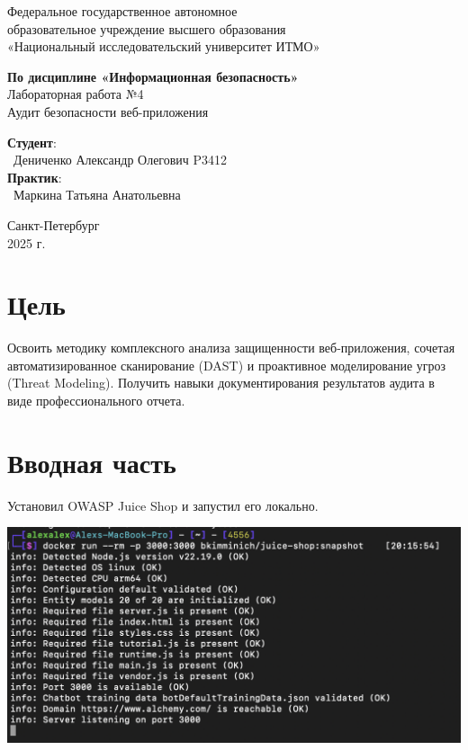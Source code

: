 \documentclass{article}
\begin{document}
\begin{center}
    \Large
    Федеральное государственное автономное \\
    образовательное учреждение высшего образования \\ 
    «Национальный исследовательский университет ИТМО»\\
    \vspace{0.5cm}
    \large
    
    \vspace{1cm}
    \Large
    \textbf{По дисциплине «Информационная безопасность»} \\
        Лабораторная работа №4\\
        Аудит безопасности веб-приложения
    \large
    \vspace{8cm}

    \begin{minipage}{.33\textwidth}
    \end{minipage}
    \hfill
    \begin{minipage}{.4\textwidth}
    
        \textbf{Студент}: \vspace{.1cm} \\
        \ Дениченко Александр Олегович P3412\\
        \textbf{Практик}:  \\
        \ Маркина Татьяна Анатольевна
    \end{minipage}
    \vfill
Санкт-Петербург\\ 2025 г.
\end{center}
\pagestyle{empty}
\newpage
\pagestyle{plain}

\section*{Цель}
Освоить методику комплексного анализа защищенности веб-приложения, сочетая
автоматизированное сканирование (DAST) и проактивное моделирование угроз (Threat Modeling).
Получить навыки документирования результатов аудита в виде профессионального отчета.

\section{Вводная часть}

Установил OWASP Juice Shop и запустил его локально.
\begin{center}
  \includegraphics[width=.9\textwidth]{start}
\end{center}
\end{document}
